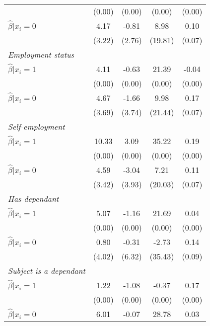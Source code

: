 \begin{table}[h]
{\begin{threeparttable}
\begin{tabular}{l*{4}{c}}
                &   (0.00)&   (0.00)&   (0.00)&   (0.00)\\
\hspace{0.5cm} \(\hat\beta|x_i=0\)&     4.17&    -0.81&     8.98&     0.10\\
                &   (3.22)&   (2.76)&  (19.81)&   (0.07)\\
\textit{Employment status}&         &         &         &         \\
\hspace{0.5cm} \(\hat\beta|x_i=1\)&     4.11&    -0.63&    21.39&    -0.04\\
                &   (0.00)&   (0.00)&   (0.00)&   (0.00)\\
\hspace{0.5cm} \(\hat\beta|x_i=0\)&     4.67&    -1.66&     9.98&0.17\sym{**}\\
                &   (3.69)&   (3.74)&  (21.44)&   (0.07)\\
\textit{Self-employment}&         &         &         &         \\
\hspace{0.5cm} \(\hat\beta|x_i=1\)&10.33\sym{*}&     3.09&    35.22&     0.19\\
                &   (0.00)&   (0.00)&   (0.00)&   (0.00)\\
\hspace{0.5cm} \(\hat\beta|x_i=0\)&     4.59&    -3.04&     7.21&0.11\sym{*}\\
                &   (3.42)&   (3.93)&  (20.03)&   (0.07)\\
\textit{Has dependant}&         &         &         &         \\
\hspace{0.5cm} \(\hat\beta|x_i=1\)&5.07\sym{*}&    -1.16&    21.69&     0.04\\
                &   (0.00)&   (0.00)&   (0.00)&   (0.00)\\
\hspace{0.5cm} \(\hat\beta|x_i=0\)&     0.80&    -0.31&    -2.73&     0.14\\
                &   (4.02)&   (6.32)&  (35.43)&   (0.09)\\
\textit{Subject is a dependant}&         &         &         &         \\
\hspace{0.5cm} \(\hat\beta|x_i=1\)&     1.22&    -1.08&    -0.37&0.17\sym{**}\\
                &   (0.00)&   (0.00)&   (0.00)&   (0.00)\\
\hspace{0.5cm} \(\hat\beta|x_i=0\)&6.01\sym{*}&    -0.07&    28.78&     0.03\\

\end{tabular}
\end{threeparttable}}
\end{table}
